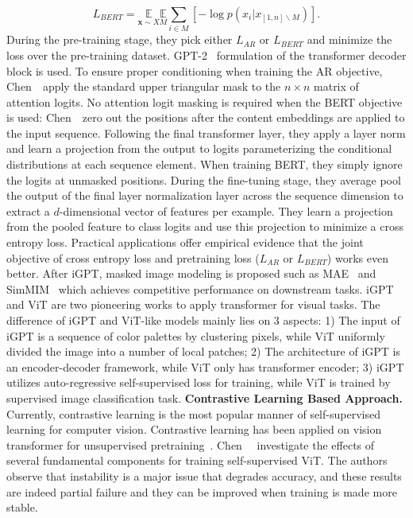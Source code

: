 \begin{equation}
	L_{BERT}=\underset{\mathbf x\sim X}{\mathbb{E}} \underset{M}{\mathbb{E}} \sum_{i\in M}[-\log p(x_i|x_{[1,n]\backslash M})].
\end{equation}
During the pre-training stage, they pick either $L_{AR}$ or $L_{BERT}$ and minimize the loss over the pre-training dataset. 
GPT-2~ formulation of the transformer decoder block is used. To ensure proper conditioning when training the AR objective, Chen~\etal~apply the standard upper triangular mask to the $n\times n$ matrix of attention logits. No attention logit masking is required when the BERT objective is used: Chen~\etal~zero out the positions after the content embeddings are applied to the input sequence. Following the final transformer layer, they apply a layer norm and learn a projection from the output to logits parameterizing the conditional distributions at each sequence element. When training BERT, they simply ignore the logits at unmasked positions. 
During the fine-tuning stage, they average pool the output of the final layer normalization layer across the sequence dimension to extract a $d$-dimensional vector of features per example.
They learn a projection from the pooled feature to class logits and use this projection to minimize a cross entropy loss. Practical applications offer empirical evidence that the joint objective of cross entropy loss and pretraining loss ($L_{AR}$ or $L_{BERT}$) works even better. After iGPT, masked image modeling is proposed such as MAE~ and SimMIM~ which achieves competitive performance on downstream tasks.
iGPT and ViT are two pioneering works to apply transformer for visual tasks. The difference of iGPT and ViT-like models mainly lies on 3 aspects: 1) The input of iGPT is a sequence of color palettes by clustering pixels, while ViT uniformly divided the image into a number of local patches; 2) The architecture of iGPT is an encoder-decoder framework, while ViT only has transformer encoder; 3) iGPT utilizes auto-regressive self-supervised loss for training, while ViT is trained by supervised image classification task.
\noindent\textbf{Contrastive Learning Based Approach.}
Currently, contrastive learning is the most popular manner of self-supervised learning for computer vision. Contrastive learning has been applied on vision transformer for unsupervised pretraining~.
Chen~\etal~ investigate the effects of several fundamental components for training self-supervised ViT. The authors observe that instability is a major issue that degrades accuracy, and these results are indeed partial failure and they can be improved when training is made more stable. 

